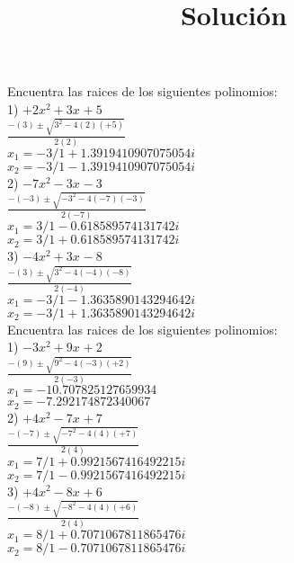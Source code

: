 \documentclass[a4paper,12pt]{article}
\title{Solución}
\author{}
\date{}
\begin{document}
\maketitle
Encuentra las raices de los siguientes polinomios: \vspace{1cm}\\ 
1) $ +2x^{2}+3x^{}+5$ 
\vspace{0.5cm}\\ 
$\frac{-(3)\pm\sqrt{3^2-4(2)(+5)}  }{2(2)}$
\vspace{0.5cm}\\
$x_1=-3/1+1.3919410907075054i$\\
$x_2=-3/1-1.3919410907075054i$
\vspace{1cm}\\ 
2) $ -7x^{2}-3x^{}-3$ 
\vspace{0.5cm}\\ 
$\frac{-(-3)\pm\sqrt{-3^2-4(-7)(-3)}  }{2(-7)}$
\vspace{0.5cm}\\
$x_1=3/1-0.618589574131742i$\\
$x_2=3/1+0.618589574131742i$
\vspace{1cm}\\ 
3) $ -4x^{2}+3x^{}-8$ 
\vspace{0.5cm}\\ 
$\frac{-(3)\pm\sqrt{3^2-4(-4)(-8)}  }{2(-4)}$
\vspace{0.5cm}\\
$x_1=-3/1-1.3635890143294642i$\\
$x_2=-3/1+1.3635890143294642i$
\vspace{1cm}\\ 

 \pagebreak 
Encuentra las raices de los siguientes polinomios: \vspace{1cm}\\ 
1) $ -3x^{2}+9x^{}+2$ 
\vspace{0.5cm}\\ 
$\frac{-(9)\pm\sqrt{9^2-4(-3)(+2)}  }{2(-3)}$
\vspace{0.5cm}\\
$x_1=-10.707825127659934$\\
$x_2=-7.292174872340067$
\vspace{1cm}\\ 
2) $ +4x^{2}-7x^{}+7$ 
\vspace{0.5cm}\\ 
$\frac{-(-7)\pm\sqrt{-7^2-4(4)(+7)}  }{2(4)}$
\vspace{0.5cm}\\
$x_1=7/1+0.9921567416492215i$\\
$x_2=7/1-0.9921567416492215i$
\vspace{1cm}\\ 
3) $ +4x^{2}-8x^{}+6$ 
\vspace{0.5cm}\\ 
$\frac{-(-8)\pm\sqrt{-8^2-4(4)(+6)}  }{2(4)}$
\vspace{0.5cm}\\
$x_1=8/1+0.7071067811865476i$\\
$x_2=8/1-0.7071067811865476i$
\vspace{1cm}\\ 
\end{document}
